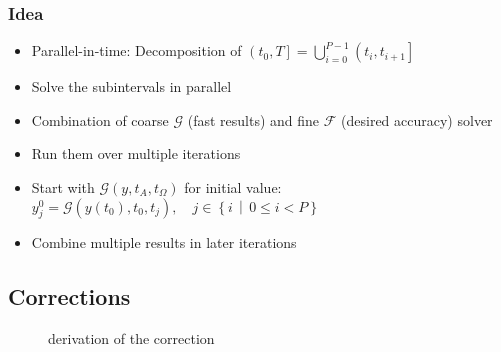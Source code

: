 \begin{frame}
    \frametitle{Idea}
    \begin{itemize}[<+->]
        \item Parallel-in-time: Decomposition of \(\left(t_0, T\right] = \bigcup_{i=0}^{P-1} \left(t_i, t_{i+1}\right]\)
        \item Solve the subintervals in parallel
        \item Combination of coarse \(\mathcal{G}\) (fast results) and fine \(\mathcal{F}\) (desired accuracy) solver
        \item Run them over multiple iterations
        \item Start with \(\mathcal{G}\!\left(y, t_{A}, t_{\Omega}\right)\) for initial value:\\\(y_{j}^{0} = \mathcal{G}\!\left(y(t_0), t_0, t_{j}\right), \quad j \in \left\{i \,\middle|\, 0 \leq i < P\right\}\)
        \item Combine multiple results in later iterations
    \end{itemize}
    \end{frame}

\subsection{Corrections}

\begin{frame}
\begin{figure}[ht]
    \centering
        \begin{tikzpicture}[scale=1.7]
            
        \end{tikzpicture}
    \caption{derivation of the correction}
    \label{fig:merge}
\end{figure}
\end{frame}

